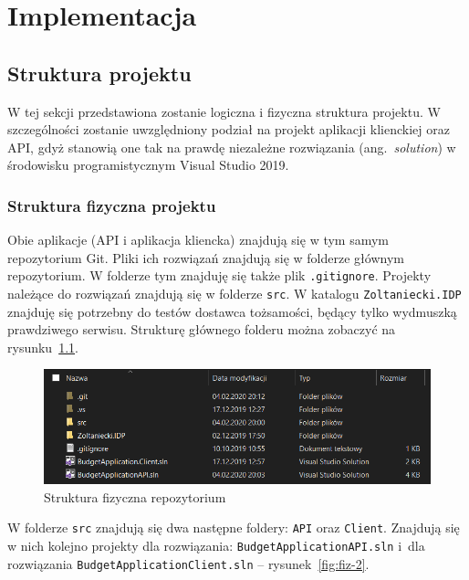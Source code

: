 \chapter{Implementacja}
\label{chap:implementacja}

\section{Struktura projektu}
\label{sec:struktura-projektu}

W tej sekcji przedstawiona zostanie logiczna i fizyczna struktura projektu. W szczególności zostanie uwzględniony podział na projekt aplikacji klienckiej oraz API, gdyż stanowią one tak na prawdę niezależne rozwiązania (ang.~\emph{solution}) w środowisku programistycznym Visual Studio 2019.

\subsection{Struktura fizyczna projektu}
\label{sec:struktura-fizyczna-projektu}

Obie aplikacje (API i aplikacja kliencka) znajdują się w tym samym repozytorium Git. Pliki ich rozwiązań znajdują się w folderze głównym repozytorium. W folderze tym znajduję się także plik \texttt{.gitignore}. Projekty należące do rozwiązań znajdują się w folderze \texttt{src}. W katalogu \texttt{Zoltaniecki.IDP} znajduję się potrzebny do testów dostawca tożsamości, będący tylko wydmuszką prawdziwego serwisu. Strukturę głównego folderu można zobaczyć na rysunku~\ref{fig:fiz-1}.

\begin{figure}[b]
	\centering
	\includegraphics[width=.8\linewidth]{rys04/struktura-fizyczna-1.PNG}
	\caption{Struktura fizyczna repozytorium}
	\label{fig:fiz-1}
\end{figure}

W folderze \texttt{src} znajdują się dwa następne foldery: \texttt{API} oraz \texttt{Client}. Znajdują się w nich kolejno projekty dla rozwiązania: \texttt{BudgetApplicationAPI.sln} i~dla rozwiązania \texttt{BudgetApplicationClient.sln} -- rysunek~\ref{fig:fiz-2}. 

